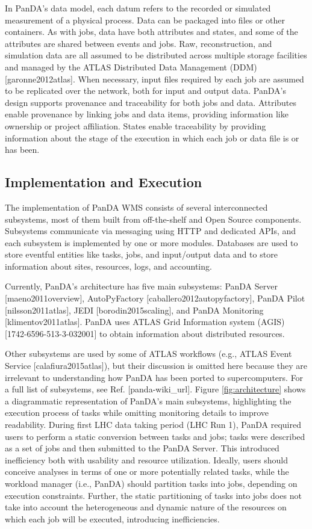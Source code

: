 In PanDA's data model, each datum refers to the recorded or simulated
measurement of a physical process. Data can be packaged into files or other
containers. As with jobs, data have both attributes and states, and some of the
attributes are shared between events and jobs. Raw, reconstruction, and
simulation data are all assumed to be distributed across multiple storage
facilities and managed by the ATLAS Distributed Data Management (DDM)
[garonne2012atlas]. When necessary, input files required by each job are
assumed to be replicated over the network, both for input and output data.
PanDA's design supports provenance and traceability for both jobs and data.
Attributes enable provenance by linking jobs and data items, providing
information like ownership or project affiliation. States enable traceability
by providing information about the stage of the execution in which each job or
data file is or has been.

\subsection{Implementation and Execution}
\label{subsec:implementation}

The implementation of PanDA WMS consists of several interconnected subsystems,
most of them built from off-the-shelf and Open Source components. Subsystems
communicate via messaging using HTTP and dedicated APIs, and each subsystem is
implemented by one or more modules. Databases are used to store eventful
entities like tasks, jobs, and input/output data and to store information about
sites, resources, logs, and accounting.

Currently, PanDA's architecture has five main subsystems: PanDA Server
[maeno2011overview], AutoPyFactory [caballero2012autopyfactory], PanDA Pilot
[nilsson2011atlas], JEDI [borodin2015scaling], and PanDA Monitoring
[klimentov2011atlas]. PanDA uses ATLAS Grid Information system (AGIS)
[1742-6596-513-3-032001] to obtain information about distributed resources.

Other subsystems are used by some of ATLAS workflows (e.g., ATLAS Event Service
[calafiura2015atlas]), but their discussion is omitted here because they are
irrelevant to understanding how PanDA has been ported to supercomputers. For a
full list of subsystems, see Ref. [panda-wiki\_url]. Figure
\ref{fig:architecture} shows a diagrammatic representation of PanDA's main
subsystems, highlighting the execution process of tasks while omitting
monitoring details to improve readability. During first LHC data taking period
(LHC Run 1), PanDA required users to perform a static conversion between tasks
and jobs; tasks were described as a set of jobs and then submitted to the PanDA
Server. This introduced inefficiency both with usability and resource
utilization. Ideally, users should conceive analyses in terms of one or more
potentially related tasks, while the workload manager (i.e., PanDA) should
partition tasks into jobs, depending on execution constraints. Further, the
static partitioning of tasks into jobs does not take into account the
heterogeneous and dynamic nature of the resources on which each job will be
executed, introducing inefficiencies.

